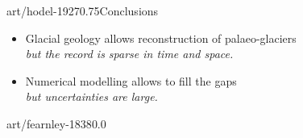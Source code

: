 \begin{CJK}{UTF8}{min}
%
%
%

    \begin{sectionframe}{art/hodel-1927}{0.75}{Conclusions}
      \begin{itemize}
        \item Glacial geology allows reconstruction of palaeo-glaciers\\
          \emph{\small but the record is sparse in time and space.}
        \pause\bigskip
        \item Numerical modelling allows to fill the gaps\\
          \emph{\small but uncertainties are large.}
      \end{itemize}
    \end{sectionframe}

    \begin{backgroundframe}[b]{art/fearnley-1838}{0.0}{}
      \flushleft{}
    \end{backgroundframe}


\end{CJK}

